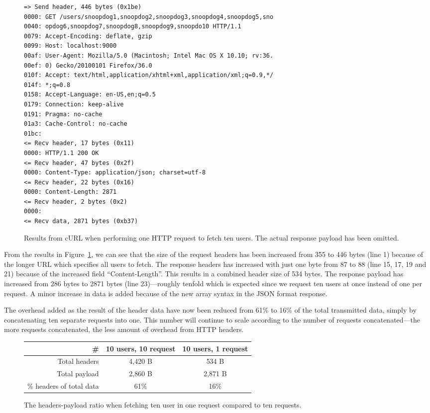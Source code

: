 \documentclass{cslthse-msc}
\begin{document}
\begin{figure}[H]
  \centering
\begin{lstlisting}[breaklines=true]
=> Send header, 446 bytes (0x1be)
0000: GET /users/snoopdog1,snoopdog2,snoopdog3,snoopdog4,snoopdog5,sno
0040: opdog6,snoopdog7,snoopdog8,snoopdog9,snoopdo10 HTTP/1.1
0079: Accept-Encoding: deflate, gzip
0099: Host: localhost:9000
00af: User-Agent: Mozilla/5.0 (Macintosh; Intel Mac OS X 10.10; rv:36.
00ef: 0) Gecko/20100101 Firefox/36.0
010f: Accept: text/html,application/xhtml+xml,application/xml;q=0.9,*/
014f: *;q=0.8
0158: Accept-Language: en-US,en;q=0.5
0179: Connection: keep-alive
0191: Pragma: no-cache
01a3: Cache-Control: no-cache
01bc:
<= Recv header, 17 bytes (0x11)
0000: HTTP/1.1 200 OK
<= Recv header, 47 bytes (0x2f)
0000: Content-Type: application/json; charset=utf-8
<= Recv header, 22 bytes (0x16)
0000: Content-Length: 2871
<= Recv header, 2 bytes (0x2)
0000:
<= Recv data, 2871 bytes (0xb37)
\end{lstlisting}
  \caption{Results from cURL when performing one HTTP request to fetch ten users. The actual response payload has been omitted.}
  \label{fig:headers_overhead2}
\end{figure}

From the results in Figure~\ref{fig:headers_overhead2}, we can see that the size of the request headers has been increased from 355 to 446 bytes (line 1) because of the longer URL which specifies all users to fetch. The response headers has increased with just one byte from 87 to 88 (line 15, 17, 19 and 21) because of the increased field \enquote{Content-Length}. This results in a combined header size of 534 bytes. The response payload has increased from 286 bytes to 2871 bytes (line 23)---roughly tenfold which is expected since we request ten users at once instead of one per request. A minor increase in data is added because of the new array syntax in the JSON format response.

The overhead added as the result of the header data have now been reduced from 61\% to 16\% of the total transmitted data, simply by concatenating ten separate requests into one. This number will continue to scale according to the number of requests concatenated---the more requests concatenated, the less amount of overhead from HTTP headers.

\begin{figure}[H]
  \centering
    \begin{center}
      \begin{tabular}{ r | c | c }
        \textbf{\#} & \textbf{10 users, 10 request} & \textbf{10 users, 1 request} \\ \hline
        Total headers & 4,420 B & 534 B \\ \hline
        Total payload & 2,860 B & 2,871 B \\ \hline
        \% headers of total data & 61\% & 16\% \\ \hline
      \end{tabular}
    \end{center}
  \caption{The headers-payload ratio when fetching ten user in one request compared to ten requests.}
\end{figure}
\end{document}
